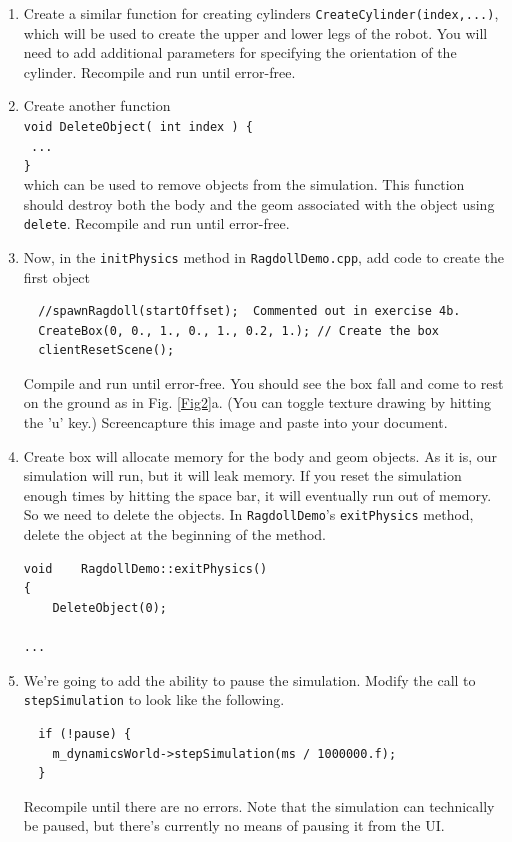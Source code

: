 \documentclass[12pt]{article}
\begin{document}
\begin{enumerate}
\item Create a similar function for creating cylinders \verb|CreateCylinder(index,...)|, which will be used to create the upper and lower legs of the robot. You will need to add additional parameters for specifying the orientation of the cylinder. Recompile and run until error-free.

\item Create another function \\
\texttt{void DeleteObject( int index ) \{}\\
\texttt{  ...}\\
\texttt{\}} \\
which can be used to remove objects from the simulation. This function should destroy both the body and the geom associated with the object using \texttt{delete}. Recompile and run until error-free.

\item Now, in the \verb|initPhysics| method in \verb|RagdollDemo.cpp|, add code to create the first object

\begin{verbatim}
  //spawnRagdoll(startOffset);  Commented out in exercise 4b.
  CreateBox(0, 0., 1., 0., 1., 0.2, 1.); // Create the box
  clientResetScene();   
\end{verbatim}
Compile and run until error-free.  You should see the box fall and come to rest on the ground as in Fig. \ref{Fig2}a. (You can toggle texture drawing by hitting the 'u' key.) Screencapture this image and paste into your document.

\item Create box will allocate memory for the body and geom objects.  As it is, our simulation will run, but it will leak memory.  If you reset the simulation enough times by hitting the space bar, it will eventually run out of memory.  So we need to delete the objects.  In \verb|RagdollDemo|'s \verb|exitPhysics| method, delete the object at the beginning of the method. 
\begin{verbatim}
void	RagdollDemo::exitPhysics()
{
    DeleteObject(0);

...
\end{verbatim}

\item We're going to add the ability to pause the simulation.  Modify the call to \verb|stepSimulation| to look like the following.

\begin{verbatim}
  if (!pause) {
    m_dynamicsWorld->stepSimulation(ms / 1000000.f);
  }
\end{verbatim}
Recompile until there are no errors.  Note that the simulation can technically be paused, but there's currently no means of pausing it from the UI.  


\end{enumerate}
\end{document}
